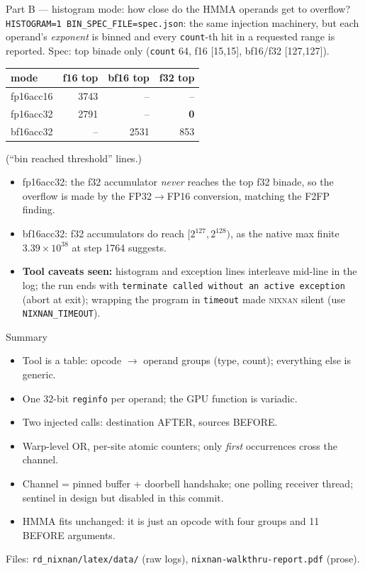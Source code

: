 \documentclass[aspectratio=169,10pt]{beamer}
\newcommand{\nn}{\textsc{nixnan}}
\begin{document}
\begin{frame}[fragile]{Part B --- histogram mode: how close do the HMMA operands get to overflow?}
\small \texttt{HISTOGRAM=1 BIN\_SPEC\_FILE=spec.json}: the same injection machinery, but each operand's \emph{exponent} is binned and every \texttt{count}-th hit in a requested range is reported. Spec: top binade only (\texttt{count} 64, f16 [15,15], bf16/f32 [127,127]).
\begin{center}\begin{tabular}{@{}lrrr@{}}
mode & f16 top & bf16 top & f32 top\\\hline
fp16acc16 & 3743 & -- & --\\
fp16acc32 & 2791 & -- & \textbf{0}\\
bf16acc32 & -- & 2531 & 853\\
\end{tabular}\end{center}
(``bin reached threshold'' lines.)
\begin{itemize}\small
\item fp16acc32: the f32 accumulator \emph{never} reaches the top f32 binade, so the overflow is made by the FP32$\to$FP16 conversion, matching the F2FP finding.
\item bf16acc32: f32 accumulators do reach $[2^{127},2^{128})$, as the native max finite $3.39\!\times\!10^{38}$ at step 1764 suggests.
\item \textbf{Tool caveats seen:} histogram and exception lines interleave mid-line in the log; the run ends with \texttt{terminate called without an active exception} (abort at exit); wrapping the program in \texttt{timeout} made \nn{} silent (use \texttt{NIXNAN\_TIMEOUT}).
\end{itemize}
\end{frame}

\begin{frame}{Summary}
\small
\begin{itemize}
\item Tool is a table: opcode $\to$ operand groups (type, count); everything else is generic.
\item One 32-bit \texttt{reginfo} per operand; the GPU function is variadic.
\item Two injected calls: destination AFTER, sources BEFORE.
\item Warp-level OR, per-site atomic counters; only \emph{first} occurrences cross the channel.
\item Channel = pinned buffer + doorbell handshake; one polling receiver thread; sentinel in design but disabled in this commit.
\item HMMA fits unchanged: it is just an opcode with four groups and 11 BEFORE arguments.
\end{itemize}
Files: \texttt{rd\_nixnan/latex/data/} (raw logs), \texttt{nixnan-walkthru-report.pdf} (prose).
\end{frame}
\end{document}
